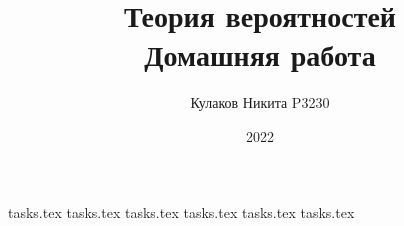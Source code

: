 
\title{Теория вероятностей\\ Домашняя работа}
\date{2022}
\author{Кулаков Никита P3230}



\maketitle

\begin{sloppypar}
\tableofcontents
\newpage
{tasks.tex}
{tasks.tex}
{tasks.tex}
{tasks.tex}
{tasks.tex}
{tasks.tex}
\end{sloppypar}

